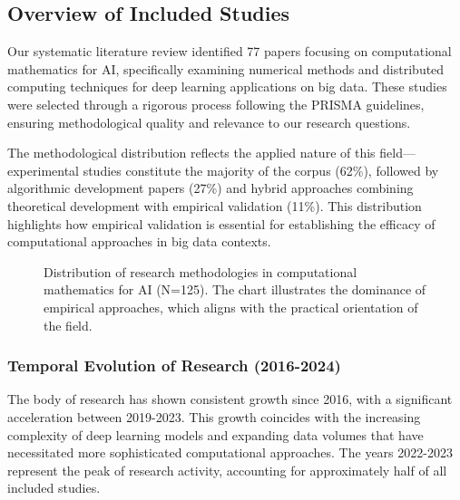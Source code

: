 

\subsection{Overview of Included Studies}
Our systematic literature review identified 77 papers focusing on computational mathematics for AI, specifically examining numerical methods and distributed computing techniques for deep learning applications on big data. These studies were selected through a rigorous process following the PRISMA guidelines, ensuring methodological quality and relevance to our research questions.

The methodological distribution reflects the applied nature of this field—experimental studies constitute the majority of the corpus (62\%), followed by algorithmic development papers (27\%) and hybrid approaches combining theoretical development with empirical validation (11\%). This distribution highlights how empirical validation is essential for establishing the efficacy of computational approaches in big data contexts.

\begin{figure}[h]
\centering
{}
\caption{Distribution of research methodologies in computational mathematics for AI (N=125). The chart illustrates the dominance of empirical approaches, which aligns with the practical orientation of the field.}
\label{fig:methodology_distribution}
\end{figure}

\subsubsection{Temporal Evolution of Research (2016-2024)}
The body of research has shown consistent growth since 2016, with a significant acceleration between 2019-2023. This growth coincides with the increasing complexity of deep learning models and expanding data volumes that have necessitated more sophisticated computational approaches. The years 2022-2023 represent the peak of research activity, accounting for approximately half of all included studies.


